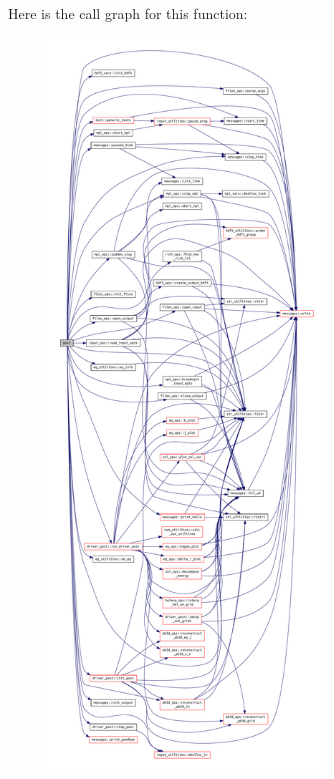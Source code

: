 Here is the call graph for this function\+:\nopagebreak
\begin{figure}[H]
\begin{center}
\leavevmode
\includegraphics[height=550pt]{POST_8f90_ac289b64ac4671fea0b4f2298ba1188a1_cgraph}
\end{center}
\end{figure}
